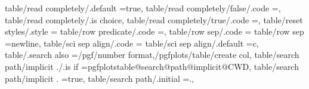 {{{{{{{{{{{{{{{{{{{{{{{{{{{{{{{{{{{{{{table/read completely/.default                                     =true,                                                                                                                              
table/read completely/false/.code                                  =\pgfplots@addplotimpl@readcompletelyfalse\def\pgfplots@addplotimpl@readcompletely@auto{0},                                         
table/read completely/.is choice,
table/read completely/true/.code                                   =\pgfplots@addplotimpl@readcompletelytrue\def\pgfplots@addplotimpl@readcompletely@auto{0},                                          
table/reset styles/.style                                          ={                                                                                                                                  
table/row predicate/.code                                          ={},                                                                                                                                
table/row sep/.code                                                ={%
table/row sep                                                      =newline,                                                                                                                           
table/sci sep align/.code                                          ={%
table/sci sep align/.default                                       =c,                                                                                                                                 
table/.search also                                                 ={/pgf/number format,/pgfplots/table/create col},                                                                                   
table/search path/implicit ./.is if                                =pgfplotstable@search@path@implicit@CWD,                                                                                            
table/search path/implicit .                                       =true,                                                                                                                              
table/search path/.initial                                         =.,                                                                                                                                 
}}}}}}}}}}}}}}}}}}}}}}}}}}}}}}}}}}}}}}}}}
